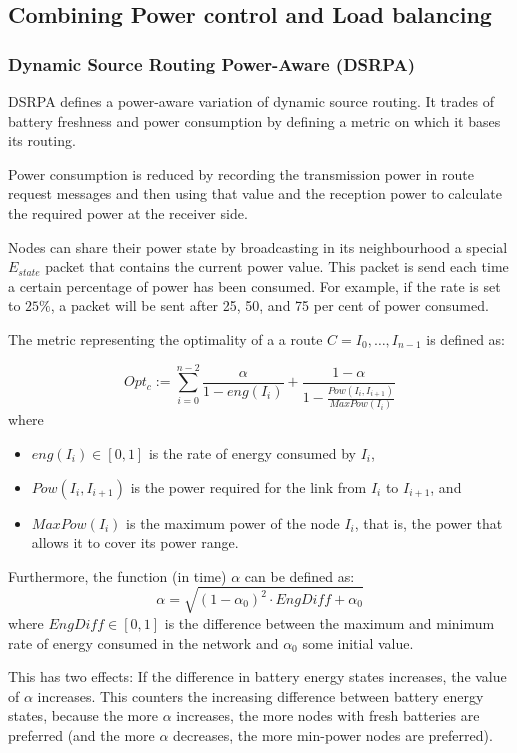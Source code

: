 \subsection{Combining Power control and Load balancing}
\subsubsection{Dynamic Source Routing Power-Aware (DSRPA)}
DSRPA\cite{djenouri2006new} defines a power-aware variation of dynamic source
routing. It trades of battery freshness and power consumption by defining a
metric on which it bases its routing.

Power consumption is reduced by recording the transmission power in route
request messages and then using that value and the reception power to calculate
the required power at the receiver side.

Nodes can share their power state by broadcasting in its neighbourhood a special
$E_{state}$ packet that contains the current power value. This packet is send
each time a certain percentage of power has been consumed. For example, if the
rate is set to $25\%$, a packet will be sent after 25, 50, and 75 per cent of
power consumed.

The metric representing the optimality of a a route $C=I_{0}, \ldots, I_{n-1}$
is defined as:

\[ Opt_{c} := \sum_{i=0}^{n-2} \frac{\alpha}{1-eng(I_{i})} + \frac{1-\alpha}{1-\frac{Pow(I_{i}, I_{i+1})}{MaxPow(I_{i})}} \]
{}
where
\begin{itemize}
    \item $eng(I_{i}) \in [0,1]$ is the rate of energy consumed by $I_{i}$,
    \item $Pow(I_{i}, I_{i+1})$ is the power required for the link from $I_{i}$ to $I_{i+1}$, and
    \item $MaxPow(I_{i})$ is the maximum power of the node $I_{i}$, that is, the power that allows
          it to cover its power range.
\end{itemize}

Furthermore, the function (in time) $\alpha$ can be defined as:
\[ \alpha = \sqrt{(1-\alpha_{0})^{2} \cdot EngDiff + \alpha_{0}} \]
where $EngDiff \in [0,1]$ is the difference between the maximum and minimum rate
of energy consumed in the network and $\alpha_{0}$ some initial value.

This has two effects: If the difference in battery energy states increases, the
value of $\alpha$ increases. This counters the increasing difference between
battery energy states, because the more $\alpha$ increases, the more nodes
with fresh batteries are preferred (and the more $\alpha$ decreases, the more
min-power nodes are preferred).

